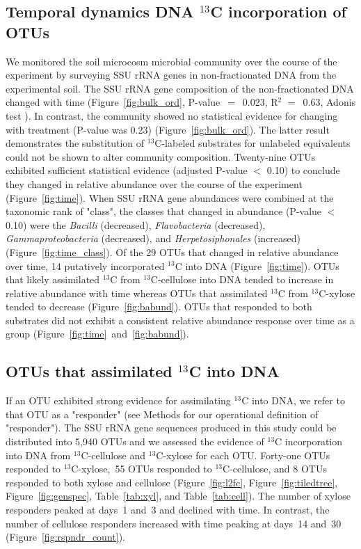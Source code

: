 \subsection{Temporal dynamics DNA $^{13}$C incorporation of OTUs}
We monitored the soil microcosm microbial community over the course of the
experiment by surveying SSU rRNA genes in non-fractionated DNA from the
experimental soil. The SSU rRNA gene composition of the non-fractionated DNA
changed with time (Figure~\ref{fig:bulk_ord}, P-value~$=$~0.023, R$^{2}$
$=$~0.63, Adonis test \citep{Anderson2001a}). In contrast, the community showed
no statistical evidence for changing with treatment (P-value was 0.23)
(Figure~\ref{fig:bulk_ord}). The latter result demonstrates the substitution of
$^{13}$C-labeled substrates for unlabeled equivalents could not be shown to
alter community composition. Twenty-nine OTUs exhibited sufficient statistical
evidence (adjusted P-value $<$ 0.10) to conclude they changed in relative
abundance over the course of the experiment (Figure~\ref{fig:time}). When SSU
rRNA gene abundances were combined at the taxonomic rank of "class", the
classes that changed in abundance (P-value $<$
  0.10) were the \textit{Bacilli} (decreased), \textit{Flavobacteria}
  (decreased), \textit{Gammaproteobacteria} (decreased), and
  \textit{Herpetosiphonales} (increased) (Figure~\ref{fig:time_class}). Of the
  29 OTUs that changed in relative abundance over time, 14 putatively
  incorporated $^{13}$C into DNA (Figure~\ref{fig:time}). OTUs that likely
  assimilated $^{13}$C from $^{13}$C-cellulose into DNA tended to increase in
  relative abundance with time whereas OTUs that assimilated $^{13}$C from
  $^{13}$C-xylose tended to decrease (Figure~\ref{fig:babund}). OTUs that
  responded to both substrates did not exhibit a consistent relative abundance
  response over time as a group (Figure~\ref{fig:time}~and~\ref{fig:babund}).

\subsection{OTUs that assimilated $^{13}$C into DNA} \label{responders}
If an OTU exhibited strong evidence for assimilating $^{13}$C into DNA, we
refer to that OTU as a "responder" (see Methods for our
operational definition of "responder"). The SSU rRNA gene sequences produced in
this study could be distributed into 5,940 OTUs and we assessed the evidence of
$^{13}$C incorporation into DNA from $^{13}$C-cellulose and $^{13}$C-xylose for
each OTU. Forty-one OTUs responded to $^{13}$C-xylose,~55 OTUs responded to
$^{13}$C-cellulose, and 8 OTUs responded to both xylose and cellulose
(Figure~\ref{fig:l2fc}, Figure~\ref{fig:tiledtree}, Figure~\ref{fig:genspec},
Table~\ref{tab:xyl}, and Table~\ref{tab:cell}). The number of xylose responders
peaked at days~1 and~3 and declined with time. In contrast, the number of
cellulose responders increased with time peaking at days~14 and~30
(Figure~\ref{fig:rspndr_count}). 

